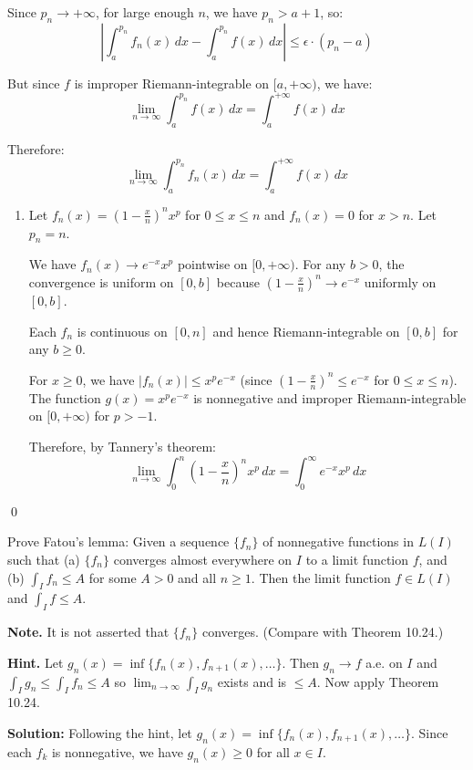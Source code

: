 Since $p_n \to +\infty$, for large enough $n$, we have $p_n > a + 1$, so:
\[|\int_a^{p_n} f_n(x) \, dx - \int_a^{p_n} f(x) \, dx| \leq \epsilon \cdot (p_n - a)\]

But since $f$ is improper Riemann-integrable on $[a,+\infty)$, we have:
\[\lim_{n \to \infty} \int_a^{p_n} f(x) \, dx = \int_a^{+\infty} f(x) \, dx\]

Therefore:
\[\lim_{n \to \infty} \int_a^{p_n} f_n(x) \, dx = \int_a^{+\infty} f(x) \, dx\]

\begin{enumerate}[label=(\alph*),resume]
    \item Let $f_n(x) = (1 - \frac{x}{n})^n x^p$ for $0 \leq x \leq n$ and $f_n(x) = 0$ for $x > n$. Let $p_n = n$.

    We have $f_n(x) \to e^{-x}x^p$ pointwise on $[0,+\infty)$. For any $b > 0$, the convergence is uniform on $[0,b]$ because $(1 - \frac{x}{n})^n \to e^{-x}$ uniformly on $[0,b]$.

    Each $f_n$ is continuous on $[0,n]$ and hence Riemann-integrable on $[0,b]$ for any $b \geq 0$.

    For $x \geq 0$, we have $|f_n(x)| \leq x^p e^{-x}$ (since $(1 - \frac{x}{n})^n \leq e^{-x}$ for $0 \leq x \leq n$). The function $g(x) = x^p e^{-x}$ is nonnegative and improper Riemann-integrable on $[0,+\infty)$ for $p > -1$.

    Therefore, by Tannery's theorem:
    \[\lim_{n \to \infty} \int_{0}^{n} \left( 1 - \frac{x}{n} \right)^n x^p \, dx = \int_{0}^{\infty} e^{-x}x^p \, dx\]
\end{enumerate}\qed


\begin{problembox}
Prove Fatou's lemma: Given a sequence $\{f_n\}$ of nonnegative functions in $L(I)$ such that (a) $\{f_n\}$ converges almost everywhere on $I$ to a limit function $f$, and (b) $\int_I f_n \leq A$ for some $A > 0$ and all $n \geq 1$. Then the limit function $f \in L(I)$ and $\int_I f \leq A$.

\textbf{Note.} It is not asserted that $\{f_n\}$ converges. (Compare with Theorem 10.24.)

\textbf{Hint.} Let $g_n(x) = \inf \{f_n(x), f_{n+1}(x), \ldots\}$. Then $g_n \to f$ a.e. on $I$ and $\int_I g_n \leq \int_I f_n \leq A$ so $\lim_{n \to \infty} \int_I g_n$ exists and is $\leq A$. Now apply Theorem 10.24.
\end{problembox}

\bigskip\noindent\textbf{Solution:}
Following the hint, let $g_n(x) = \inf \{f_n(x), f_{n+1}(x), \ldots\}$. Since each $f_k$ is nonnegative, we have $g_n(x) \geq 0$ for all $x \in I$.

